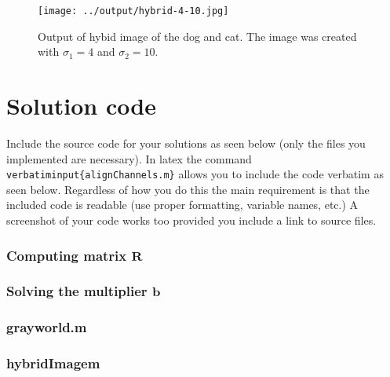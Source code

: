 \documentclass[10pt,letterpaper]{article}
\newcommand{\cmd}[1] {{\color{blue}\texttt{#1}}}
\begin{document}
\begin{figure}[h]
\texttt{[image: ../output/hybrid-4-10.jpg]}
\caption{Output of hybid image of the dog and cat. The image was created with $\sigma_1 = 4$ and $\sigma_2 = 10$.}
\end{figure}


\newpage

\section{Solution code}
Include the source code for your solutions as seen below (only the files you implemented are necessary). 
In latex the command \cmd{verbatiminput\{alignChannels.m\}} allows you to include the code verbatim as seen below. 
Regardless of how you do this the main requirement is that the included code is readable (use proper formatting, variable names, etc.)
A screenshot of your code works too provided you include a link to source files.



\subsubsection{Computing matrix $\mathbf{R}$}

\subsubsection{Solving the multiplier $\mathbf{b}$}

\subsubsection{grayworld.m}

\subsubsection{hybridImagem}

\end{document}

